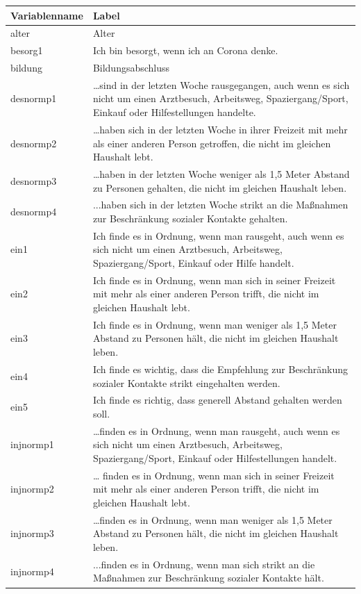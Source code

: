 \documentclass[]{book}
\begin{document}
\begin{tabular}{l|l}
\hline
Variablenname & Label\\
\hline
alter & Alter\\
\hline
besorg1 & Ich bin besorgt, wenn ich an Corona denke.\\
\hline
bildung & Bildungsabschluss\\
\hline
desnormp1 & …sind in der letzten Woche rausgegangen, auch wenn es sich nicht um einen Arztbesuch, Arbeitsweg, Spaziergang/Sport, Einkauf oder Hilfestellungen handelte.\\
\hline
desnormp2 & …haben sich in der letzten Woche in ihrer Freizeit mit mehr als einer anderen Person getroffen, die nicht im gleichen Haushalt lebt.\\
\hline
desnormp3 & …haben in der letzten Woche weniger als 1,5 Meter Abstand zu Personen gehalten, die nicht im gleichen Haushalt leben.\\
\hline
desnormp4 & ...haben sich in der letzten Woche strikt an die Maßnahmen zur Beschränkung sozialer Kontakte gehalten.\\
\hline
ein1 & Ich finde es in Ordnung, wenn man rausgeht, auch wenn es sich nicht um einen Arztbesuch, Arbeitsweg, Spaziergang/Sport, Einkauf oder Hilfe handelt.\\
\hline
ein2 & Ich finde es in Ordnung, wenn man sich in seiner Freizeit mit mehr als einer anderen Person trifft, die nicht im gleichen Haushalt lebt.\\
\hline
ein3 & Ich finde es in Ordnung, wenn man weniger als 1,5 Meter Abstand zu Personen hält, die nicht im gleichen Haushalt leben.\\
\hline
ein4 & Ich finde es wichtig, dass die Empfehlung zur Beschränkung sozialer Kontakte strikt eingehalten werden.\\
\hline
ein5 & Ich finde es richtig, dass generell Abstand gehalten werden soll.\\
\hline
injnormp1 & …finden es in Ordnung, wenn man rausgeht, auch wenn es sich nicht um einen Arztbesuch, Arbeitsweg, Spaziergang/Sport, Einkauf oder Hilfestellungen handelt.\\
\hline
injnormp2 & … finden es in Ordnung, wenn man sich in seiner Freizeit mit mehr als einer anderen Person trifft, die nicht im gleichen Haushalt lebt.\\
\hline
injnormp3 & …finden es in Ordnung, wenn man weniger als 1,5 Meter Abstand zu Personen hält, die nicht im gleichen Haushalt leben.\\
\hline
injnormp4 & ...finden es in Ordnung, wenn man sich strikt an die Maßnahmen zur Beschränkung sozialer Kontakte hält.\\

\end{tabular}
\end{document}
